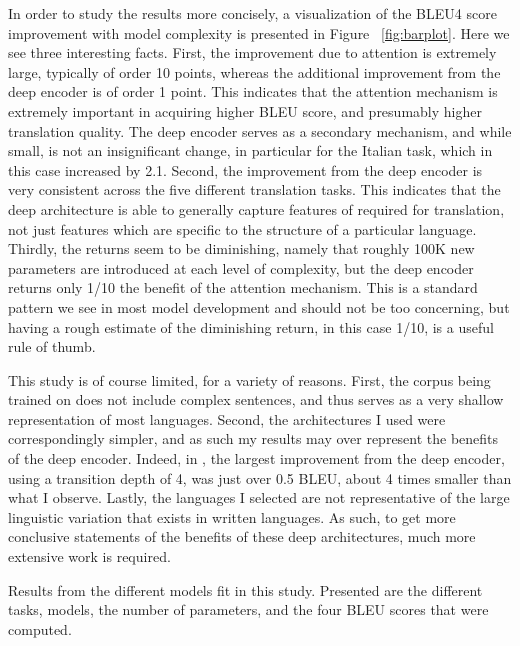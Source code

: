 \documentclass[twocolumn,superscriptaddress]{revtex4-1}
\begin{document}
In order to study the results more concisely, a visualization of the BLEU4 score improvement with model complexity is presented in Figure ~\ref{fig:barplot}.
Here we see three interesting facts.
First, the improvement due to attention is extremely large, typically of order 10 points, whereas the additional improvement from the deep encoder is of order 1 point.
This indicates that the attention mechanism is extremely important in acquiring higher BLEU score, and presumably higher translation quality.
The deep encoder serves as a secondary mechanism, and while small, is not an insignificant change, in particular for the Italian task, which in this case increased by 2.1.
Second, the improvement from the deep encoder is very consistent across the five different translation tasks.
This indicates that the deep architecture is able to generally capture features of required for translation, not just features which are specific to the structure of a particular language.
Thirdly, the returns seem to be diminishing, namely that roughly 100K new parameters are introduced at each level of complexity, but the deep encoder returns only 1/10 the benefit of the attention mechanism.
This is a standard pattern we see in most model development and should not be too concerning, but having a rough estimate of the diminishing return, in this case 1/10, is a useful rule of thumb.

This study is of course limited, for a variety of reasons.
First, the corpus being trained on does not include complex sentences, and thus serves as a very shallow representation of most languages.
Second, the architectures I used were correspondingly simpler, and as such my results may over represent the benefits of the deep encoder.
Indeed, in \cite{miceli-barone-etal-2017-deep}, the largest improvement from the deep encoder, using a transition depth of 4, was just over 0.5 BLEU, about 4 times smaller than what I observe.
Lastly, the languages I selected are not representative of the large linguistic variation that exists in written languages.
As such, to get more conclusive statements of the benefits of these deep architectures, much more extensive work is required.

\begin{table}

\caption{
Results from the different models fit in this study.
Presented are the different tasks, models, the number of parameters, and the four BLEU scores that were computed.
}
\label{fig:table}
\end{table}
\end{document}
